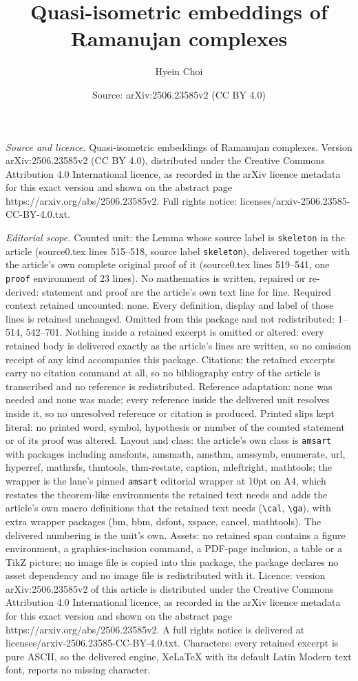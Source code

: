 \documentclass[10pt,a4paper]{amsart}
\title[Quasi-isometric embeddings of Ramanujan complexes]{Quasi-isometric embeddings of Ramanujan complexes}
\author{Hyein Choi}
\date{Source: arXiv:2506.23585v2 (CC BY 4.0)}
\begin{document}
\maketitle

\noindent\emph{Source and licence.} Quasi-isometric embeddings of Ramanujan complexes. Version arXiv:2506.23585v2 (CC BY 4.0), distributed under the Creative Commons Attribution 4.0 International licence, as recorded in the arXiv licence metadata for this exact version and shown on the abstract page https://arxiv.org/abs/2506.23585v2. Full rights notice: licenses/arxiv-2506.23585-CC-BY-4.0.txt.\par\smallskip

\noindent\textit{Editorial scope.} Counted unit: the Lemma whose source label is \texttt{skeleton} in the article (source0.tex lines 515--518, source label \texttt{skeleton}), delivered together with the article's own complete original proof of it (source0.tex lines 519--541, one \texttt{proof} environment of 23 lines). No mathematics is written, repaired or re-derived: statement and proof are the article's own text line for line. Required context retained uncounted: none. Every definition, display and label of those lines is retained unchanged. Omitted from this package and not redistributed: 1--514, 542--701. Nothing inside a retained excerpt is omitted or altered: every retained body is delivered exactly as the article's lines are written, so no omission receipt of any kind accompanies this package. Citations: the retained excerpts carry no citation command at all, so no bibliography entry of the article is transcribed and no reference is redistributed. Reference adaptation: none was needed and none was made; every reference inside the delivered unit resolves inside it, so no unresolved reference or citation is produced. Printed slips kept literal: no printed word, symbol, hypothesis or number of the counted statement or of its proof was altered. Layout and class: the article's own class is \texttt{amsart} with packages including amsfonts, amsmath, amsthm, amssymb, enumerate, url, hyperref, mathrsfs, thmtools, thm-restate, caption, mleftright, mathtools; the wrapper is the lane's pinned \texttt{amsart} editorial wrapper at 10pt on A4, which restates the theorem-like environments the retained text needs and adds the article's own macro definitions that the retained text needs (\texttt{\textbackslash cal}, \texttt{\textbackslash ga}), with extra wrapper packages (bm, bbm, dsfont, xspace, cancel, mathtools). The delivered numbering is the unit's own. Assets: no retained span contains a figure environment, a graphics-inclusion command, a PDF-page inclusion, a table or a TikZ picture; no image file is copied into this package, the package declares no asset dependency and no image file is redistributed with it. Licence: version arXiv:2506.23585v2 of this article is distributed under the Creative Commons Attribution 4.0 International licence, as recorded in the arXiv licence metadata for this exact version and shown on the abstract page https://arxiv.org/abs/2506.23585v2. A full rights notice is delivered at licenses/arxiv-2506.23585-CC-BY-4.0.txt. Characters: every retained excerpt is pure ASCII, so the delivered engine, XeLaTeX with its default Latin Modern text font, reports no missing character.
\end{document}

